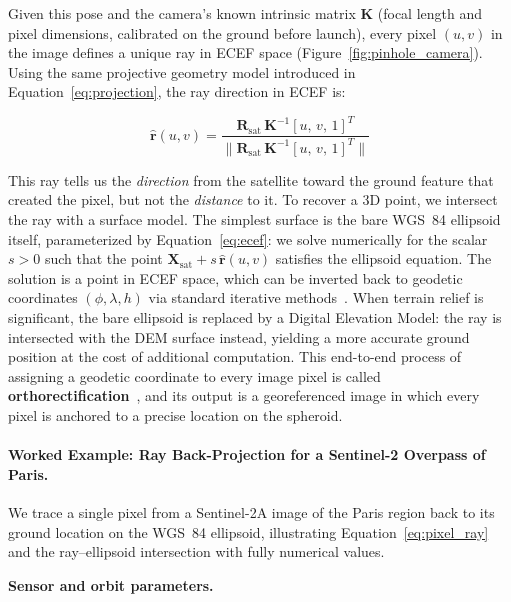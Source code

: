 \documentclass{book}
\begin{document}
Given this pose and the camera's known intrinsic matrix $\mathbf{K}$
(focal length and pixel dimensions, calibrated on the ground before
launch), every pixel $(u, v)$ in the image defines a unique ray in
ECEF space (Figure~\ref{fig:pinhole_camera}).  Using the same projective geometry model introduced in
Equation~\eqref{eq:projection}, the ray direction in ECEF is:
 
\begin{equation}
  \hat{\mathbf{r}}(u,v) =
    \frac{\mathbf{R}_{\text{sat}}\,\mathbf{K}^{-1}
    [u,\, v,\, 1]^T}
    {\bigl\|\mathbf{R}_{\text{sat}}\,\mathbf{K}^{-1}
    [u,\, v,\, 1]^T\bigr\|}
  \label{eq:pixel_ray}
\end{equation}
 
This ray tells us the \emph{direction} from the satellite toward the
ground feature that created the pixel, but not the \emph{distance} to
it.  To recover a 3D point, we intersect the ray with a surface model.
The simplest surface is the bare WGS~84 ellipsoid itself, parameterized
by Equation~\eqref{eq:ecef}: we solve numerically for the scalar
$s > 0$ such that the point
$\mathbf{X}_{\text{sat}} + s\,\hat{\mathbf{r}}(u,v)$ satisfies the
ellipsoid equation.  The solution is a point in ECEF space, which
can be inverted back to geodetic coordinates $(\phi, \lambda, h)$
via standard iterative methods~\cite{bowring1985geodetic}.  When
terrain relief is significant, the bare ellipsoid is replaced by a
Digital Elevation Model: the ray is intersected with the DEM surface
instead, yielding a more accurate ground position at the cost of
additional computation.  This end-to-end process of assigning a
geodetic coordinate to every image pixel is called
\textbf{orthorectification}~\cite{toutin2004geometric}, and its output
is a georeferenced image in which every pixel is anchored to a precise
location on the spheroid.

\paragraph{Worked Example: Ray Back-Projection for a Sentinel-2 Overpass of Paris.}

We trace a single pixel from a Sentinel-2A image of the Paris region
back to its ground location on the WGS~84 ellipsoid, illustrating
Equation~\eqref{eq:pixel_ray} and the ray--ellipsoid intersection
with fully numerical values.

\medskip
\noindent\textbf{Sensor and orbit parameters.}
\end{document}
